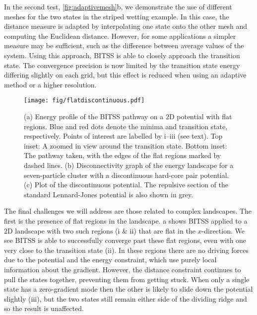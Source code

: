\documentclass[aps,prl,twocolumn,10pt,groupedaddress]{revtex4-2}
\begin{document}
In the second test, \cref{fig:adaptivemesh}b, we demonstrate the use of different meshes for the two states in the striped wetting example.
In this case, the distance measure is adapted by interpolating one state onto the other mesh and computing the Euclidean distance.
However, for some applications a simpler measure may be sufficient, such as the difference between average values of the system.
Using this approach, BITSS is able to closely approach the transition state.
The convergence precision is now limited by the transition state energy differing slightly on each grid, but this effect is reduced when using an adaptive method or a higher resolution.


\begin{figure}[tb]
  \texttt{[image: fig/flatdiscontinuous.pdf]}
  \caption{\label{fig:flatdiscontinuous}
    (a) Energy profile of the BITSS pathway on a 2D potential with flat regions.
        Blue and red dots denote the minima and transition state, respectively.
        Points of interest are labelled by i--iii (see text).
        Top inset: A zoomed in view around the transition state.
        Bottom inset: The pathway taken, with the edges of the flat regions marked by dashed lines.
    (b) Disconnectivity graph of the energy landscape for a seven-particle cluster with a discontinuous hard-core pair potential.
    (c) Plot of the discontinuous potential.
        The repulsive section of the standard Lennard-Jones potential is also shown in grey.
  }
\end{figure}

The final challenges we will address are those related to complex landscapes.
The first is the presence of flat regions in the landscape.
a shows BITSS applied to a 2D landscape with two such regions (i \& ii) that are flat in the $x$-direction.
We see BITSS is able to successfully converge past these flat regions, even with one very close to the transition state (ii).
In these regions there are no driving forces due to the potential and the energy constraint, which use purely local information about the gradient.
However, the distance constraint continues to pull the states together, preventing them from getting stuck.
When only a single state has a zero-gradient mode then the other is likely to slide down the potential slightly (iii), but the two states still remain either side of the dividing ridge and so the result is unaffected.
\end{document}
